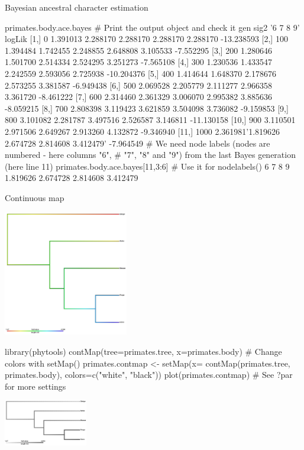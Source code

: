 \documentclass[compress, ucs, xelatex, 11pt, xcolor=svgnames,
  hyperref={
    bookmarks=true,
    unicode=true,
    colorlinks=true,
    pdftitle={Molecular data in R},
    plainpages=false,
    pdfauthor={Vojtech Zeisek},
    pdfsubject={Course about phylogeny and evolution in R},
    pdfcreator={XeLaTeX},
    pdfkeywords={R, evolution, phylogeny, molecular data},
    linkcolor=Tomato,
    anchorcolor=SaddleBrown,
    citecolor=Goldenrod,
    filecolor=DarkMagenta,
    menucolor=Sienna,
    urlcolor=DarkTurquoise,
    pdftex},
  url={hyphens, lowtilde} %
  ]{beamer}
\begin{document}
\begin{frame}[fragile]{Bayesian ancestral character estimation}
  \begin{spluscode}
    primates.body.ace.bayes # Print the output object and check it
           gen     sig2       '6        7        8        9'    logLik
     [1,]    0 1.391013 2.288170 2.288170 2.288170 2.288170 -13.238593
     [2,]  100 1.394484 1.742455 2.248855 2.648808 3.105533  -7.552295
     [3,]  200 1.280646 1.501700 2.514334 2.524295 3.251273  -7.565108
     [4,]  300 1.230536 1.433547 2.242559 2.593056 2.725938 -10.204376
     [5,]  400 1.414644 1.648370 2.178676 2.573255 3.381587  -6.949438
     [6,]  500 2.069528 2.205779 2.111277 2.966358 3.361720  -8.461222
     [7,]  600 2.314460 2.361329 3.006070 2.995382 3.885636  -8.059215
     [8,]  700 2.808398 3.119423 3.621859 3.504098 3.736082  -9.159853
     [9,]  800 3.101082 2.281787 3.497516 2.526587 3.146811 -11.130158
    [10,]  900 3.110501 2.971506 2.649267 2.913260 4.132872  -9.346940
    [11,] 1000 2.361981'1.819626 2.674728 2.814608 3.412479' -7.964549
    # We need node labels (nodes are numbered - here columns "6",
    # "7", "8" and "9") from the last Bayes generation (here line 11)
    primates.body.ace.bayes[11,3:6] # Use it for nodelabels()
           6        7        8        9
    1.819626 2.674728 2.814608 3.412479
  \end{spluscode}
\end{frame}

\begin{frame}[fragile]{Continuous map}
\begin{multicols}{2}
  \vfill
  \begin{center}
    \includegraphics[height=5.5cm]{contmap.png}
  \end{center}
  \vfill
  \begin{spluscode}
    library(phytools)
    contMap(tree=primates.tree,
      x=primates.body)
    # Change colors with setMap()
    primates.contmap <- setMap(x=
      contMap(primates.tree,
      primates.body),
      colors=c("white", "black"))
    plot(primates.contmap)
    # See ?par for more settings
  \end{spluscode}
  \vfill
  \begin{center}
    \includegraphics[height=2cm]{contmapbw.png}
  \end{center}
  \vfill
\end{multicols}
\end{frame}
\end{document}
